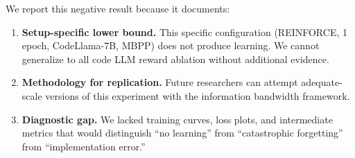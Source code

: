 We report this negative result because it documents:
\begin{enumerate}
    \item \textbf{Setup-specific lower bound.} This specific configuration (REINFORCE, 1 epoch, CodeLlama-7B, MBPP) does not produce learning. We cannot generalize to all code LLM reward ablation without additional evidence.
    \item \textbf{Methodology for replication.} Future researchers can attempt adequate-scale versions of this experiment with the information bandwidth framework.
    \item \textbf{Diagnostic gap.} We lacked training curves, loss plots, and intermediate metrics that would distinguish ``no learning'' from ``catastrophic forgetting'' from ``implementation error.''
\end{enumerate}
